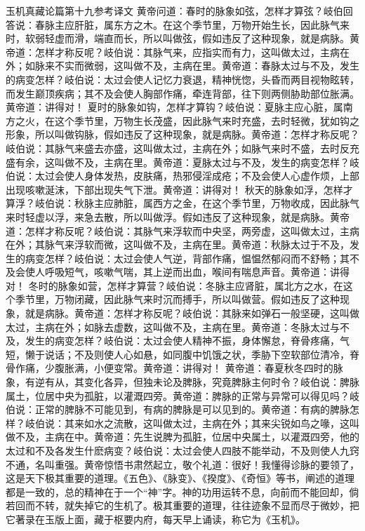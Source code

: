 \documentclass[a4paper,12pt,UTF8,twoside]{ctexbook}
\begin{document}
玉机真藏论篇第十九参考译文
黄帝问道：春时的脉象如弦，怎样才算弦？岐伯回答说：春脉主应肝脏，属东方之木。在这个季节里，万物开始生长，因此脉气来时，软弱轻虚而滑，端直而长，所以叫做弦，假如违反了这种现象，就是病脉。黄帝道：怎样才称反呢？岐伯说：其脉气来，应指实而有力，这叫做太过，主病在外；如脉来不实而微弱，这叫做不及，主病在里。黄帝道：春脉太过与不及，发生的病变怎样？岐伯说：太过会使人记忆力衰退，精神恍惚，头昏而两目视物眩转，而发生巅顶疾病；其不及会使人胸部作痛，牵连背部，往下则两侧胁助部位胀满。黄帝道：讲得对！
夏时的脉象如钩，怎样才算钩？岐伯说：夏脉主应心脏，属南方之火，在这个季节里，万物生长茂盛，因此脉气来时充盛，去时轻微，犹如钩之形象，所以叫做钩脉，假如违反了这种现象，就是病脉。黄帝道：怎样才称反呢？岐伯说：其脉气来盛去亦盛，这叫做太过，主病在外；如脉气来时不盛，去时反充盛有余，这叫做不及，主病在里。黄帝道：夏脉太过与不及，发生的病变怎样？岐伯说：太过会使人身体发热，皮肤痛，热邪侵淫成疮；不及会使人心虚作烦，上部出现咳嗽涎沫，下部出现失气下泄。黄帝道：讲得对！
秋天的脉象如浮，怎样才算浮？岐伯说：秋脉主应肺脏，属西方之金，在这个季节里，万物收成，因此脉气来时轻虚以浮，来急去散，所以叫做浮。假如违反了这种现象，就是病脉。黄帝道：怎样才称反呢？岐伯说：其脉气来浮软而中央坚，两旁虚，这叫做太过，主病在外；其脉气来浮软而微，这叫做不及，主病在里。黄帝道：秋脉太过于不及，发生的病变怎样？岐伯说：太过会使人气逆，背部作痛，愠愠然郁闷而不舒畅；其不及会使人呼吸短气，咳嗽气喘，其上逆而出血，喉间有喘息声音。黄帝道：讲得对！
冬时的脉象如营，怎样才算营？岐伯说：冬脉主应肾脏，属北方之水，在这个季节里，万物闭藏，因此脉气来时沉而搏手，所以叫做营。假如违反了这种现象，就是病脉。黄帝道：怎样才称反呢？岐伯说：其脉来如弹石一般坚硬，这叫做太过，主病在外；如脉去虚数，这叫做不及，主病在里。黄帝道：冬脉太过与不及，发生的病变怎样？岐伯说：太过会使人精神不振，身体懈怠，脊骨疼痛，气短，懒于说话；不及则使人心如悬，如同腹中饥饿之状，季胁下空软部位清冷，脊骨作痛，少腹胀满，小便变常。黄帝道：讲得对！
黄帝道：春夏秋冬四时的脉象，有逆有从，其变化各异，但独未论及脾脉，究竟脾脉主何时令？岐伯说：脾脉属土，位居中央为孤脏，以灌溉四旁。黄帝道：脾脉的正常与异常可以得见吗？岐伯说：正常的脾脉不可能见到，有病的脾脉是可以见到的。黄帝道：有病的脾脉怎样？岐伯说：其来如水之流散，这叫做太过，主病在外；其来尖锐如鸟之喙，这叫做不及，主病在中。黄帝道：先生说脾为孤脏，位居中央属土，以灌溉四旁，他的太过和不及各发生什麽病变？岐伯说：太过会使人四肢不能举动，不及则使人九窍不通，名叫重强。黄帝惊悟书肃然起立，敬个礼道：很好！我懂得诊脉的要领了，这是天下极其重要的道理。《五色》、《脉变》、《揆度》、《奇恒》等书，阐述的道理都是一致的，总的精神在于一个“神”字。神的功用运转不息，向前而不能回却，倘若回而不转，就失掉它的生机了。极其重要的道理，往往迹象不显而尽于微妙，把它著录在玉版上面，藏于枢要内府，每天早上诵读，称它为《玉机》。
\end{document}
